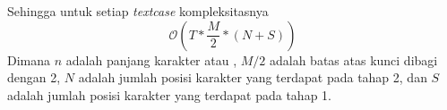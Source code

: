 	Sehingga untuk setiap \textit{textcase} kompleksitasnya 
	$$\mathcal{O}(T*\frac{M}{2}*(N+S))$$ 
	Dimana $n$ adalah panjang karakter \plaintext atau \ciphertext , $M/2$ adalah batas atas kunci dibagi dengan 2, $N$ adalah jumlah posisi karakter yang terdapat pada tahap 2, dan $S$ adalah jumlah posisi karakter yang terdapat pada tahap 1. 